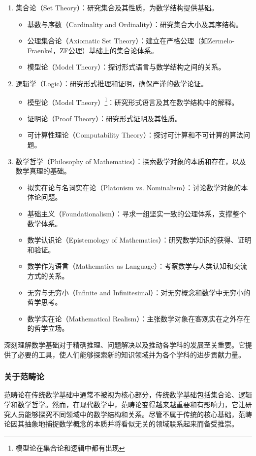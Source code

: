 \begin{enumerate}
  \item 集合论（Set Theory）：研究集合及其性质，为数学结构提供基础。
    \begin{itemize}
      \item 基数与序数（Cardinality and Ordinality）：研究集合大小及其序结构。
      \item 公理集合论（Axiomatic Set Theory）：建立在严格公理（如Zermelo-Fraenkel，ZF公理）基础上的集合论体系。
      \item 模型论（Model Theory）：探讨形式语言与数学结构之间的关系。
    \end{itemize}
    
  \item 逻辑学（Logic）：研究形式推理和证明，确保严谨的数学论证。
    \begin{itemize}
      \item 模型论（Model Theory）\footnote{模型论在集合论和逻辑中都有出现}：研究形式语言及其在数学结构中的解释。
      \item 证明论（Proof Theory）：研究形式证明及其性质。
      \item 可计算性理论（Computability Theory）：探讨可计算和不可计算的算法问题。
    \end{itemize}
    
  \item 数学哲学（Philosophy of Mathematics）：探索数学对象的本质和存在，以及数学真理的基础。
    \begin{itemize}
      \item 拟实在论与名词实在论（Platonism vs. Nominalism）：讨论数学对象的本体论问题。
      \item 基础主义（Foundationalism）：寻求一组坚实一致的公理体系，支撑整个数学体系。
      \item 数学认识论（Epistemology of Mathematics）：研究数学知识的获得、证明和验证。
      \item 数学作为语言（Mathematics as Language）：考察数学与人类认知和交流方式的关系。
      \item 无穷与无穷小（Infinite and Infinitesimal）：对无穷概念和数学中无穷小的哲学思考。
      \item 数学实在论（Mathematical Realism）：主张数学对象在客观实在之外存在的哲学立场。
    \end{itemize}
\end{enumerate}

深刻理解数学基础对于精确推理、问题解决以及推动各学科的发展至关重要。它提供了必要的工具，使人们能够探索新的知识领域并为各个学科的进步贡献力量。

\subsubsection{关于范畴论}

范畴论在传统数学基础中通常不被视为核心部分，传统数学基础包括集合论、逻辑学和数学哲学。然而，在现代数学中，范畴论变得越来越重要和有影响力，它让研究人员能够探究不同领域中的数学结构和关系。尽管不属于传统的核心基础，范畴论因其抽象地捕捉数学概念的本质并将看似无关的领域联系起来而备受推崇。
